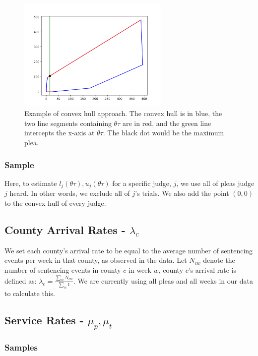 \documentclass[11pt]{article}
\theoremstyle{ModifiedStyle}
\theoremstyle{ModifiedStyle}
\begin{document}
    \begin{figure}[H]
      \centering
      \includegraphics[width=0.65\textwidth]{../../output/figures/Exploration/convex_hull_max.png}
      \caption{Example of convex hull approach. The convex hull is in blue, the two line segments containing $\theta \tau$ are in red, and the green line intercepts the x-axis at $\theta \tau$. The black dot would be the maximum plea.}
      \label{fig-convex-hull}
    \end{figure}

    \subsubsection{Sample}
      Here, to estimate $l_j(\theta \tau),u_j(\theta \tau)$ for a specific judge, $j$, we use all of pleas judge $j$ heard. In other words, we exclude all of $j$'s trials. We also add the point $(0,0)$ to the convex hull of every judge.

  \subsection{County Arrival Rates - $\lambda_c$}
    We set each county's arrival rate to be equal to the average number of sentencing events per week in that county, as observed in the data. Let $N_{cw}$ denote the number of sentencing events in county $c$ in week $w$, county $c$'s arrival rate is defined as: $\lambda_c = \frac{\sum_w N_{cw}}{\sum_w 1}$. We are currently using all pleas and all weeks in our data to calculate this.

  \subsection{Service Rates - $\mu_p,\mu_t$}
    \subsubsection{Samples}
\end{document}
